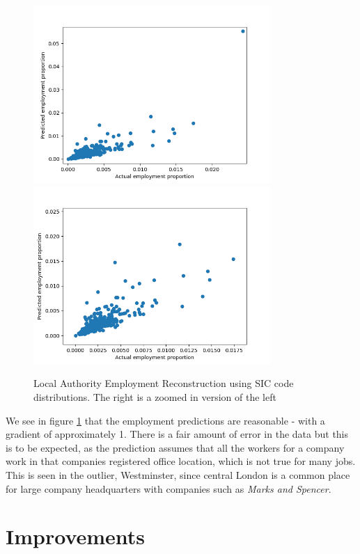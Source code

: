 \documentclass[a4paper,10pt]{article}
\begin{document}
  	\begin{figure}
      \begin{center}
         \includegraphics[width=9cm]{graphs/employment_prediction_with_london}\includegraphics[width=9cm]{graphs/employment_prediction}
         \caption{Local Authority Employment Reconstruction using SIC code distributions. The right is a zoomed in version of the left}
         \label{employment_predictions}
      \end{center}
   \end{figure}


   We see in figure \ref{employment_predictions} that the employment predictions are reasonable - with a gradient of approximately 1. There is a fair amount of error in the data but this is to be expected, as the prediction assumes that all the workers for a company work in that companies registered office location, which is not true for many jobs. This is seen in the outlier, Westminster, since central London is a common place for large company headquarters with companies such as \emph{Marks and Spencer}\cite{companieshousesnapshots}.
   

   \section{Improvements}
\end{document}
